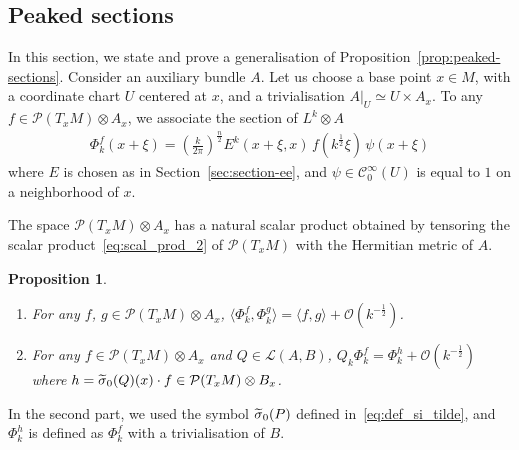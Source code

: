 \documentclass[10pt,a4paper]{article}
\newtheorem{prop}[theo]{Proposition}
\theoremstyle{definition}
\numberwithin{equation}{section}
\newcommand{\si}{{\sigma}}
\newcommand{\Ci}{{\mathcal{C}}^{\infty}}
\newcommand{\bigo}{\mathcal{O}}
\newcommand{\lag}{\mathcal{L}}
\newcommand{\pol}{\mathcal{P}}
\let\oldtilde\tilde
\renewcommand*{\tilde}[1]{\mathchoice{\widetilde{#1}}{\widetilde{#1}}{\oldtilde{#1}}{\oldtilde{#1}}}
\begin{document}
\subsection{Peaked sections}
In this section, we state and prove a generalisation of Proposition~\ref{prop:peaked-sections}. Consider an auxiliary bundle $A$. Let us choose a base point $x \in M$, with a coordinate chart $U$ centered at $x$, and a trivialisation $A|_U \simeq U \times A_x$. To any $f \in \pol (T_xM) \otimes A_x$, we associate the section of $L^k \otimes A$
\begin{gather}\label{eq:phi_peaked_section_+}
\Phi_k^f (x+\xi) = \left(\frac{k}{2\pi} \right)^{\frac{n}{2}} E^k (x+ \xi, x) \, f\left(k^{\frac{1}{2}} \xi\right) \, \psi (x+ \xi)
\end{gather}
where $E$ is chosen as in Section~\ref{sec:section-ee}, and $\psi \in \Ci_0(U)$ is equal to $1$ on a neighborhood of $x$.

 The space $\pol (T_xM) \otimes A_x$ has a natural scalar product obtained by tensoring the scalar product~\eqref{eq:scal_prod_2} of $\pol (T_xM)$ with the Hermitian metric of $A$.

\begin{prop}\label{prop:peaked-sections_++}\leavevmode
\begin{enumerate}
\item\label{prop5.7.1} For any $f$, $g \in \pol (T_x M) \otimes A_x$, $\bigl\langle
\Phi_k^f, \Phi_k^g \bigr\rangle = \langle f, g \rangle + \bigo (k^{-\frac{1}{2}})$.
\item\label{prop5.7.2} For any $f \in \pol (T_x M) \otimes A_x$ and $Q \in \lag (A,B)$, $ Q_k \Phi_k^f = \Phi_k^h + \bigo (k^{-\frac{1}{2}})$ where $h = \tilde{\si}_0 (Q)(x) \cdot f \in \pol (T_xM) \otimes B_x$.
\end{enumerate}
\end{prop}

In the second part, we used the symbol $\tilde{\si}_0 (P)$ defined in~\eqref{eq:def_si_tilde}, and $\Phi_k^{h}$ is defined as $\Phi_k^f$ with a trivialisation of $B$.
\end{document}
